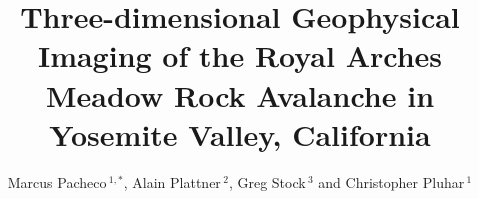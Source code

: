 \documentclass[utf8]{frontiersSCNS}
\def\firstAuthorLast{Pacheco {et~al.}} %
\def\Authors{Marcus Pacheco\,$^{1,*}$, Alain Plattner\,$^{2}$, Greg Stock\,$^{3}$ and Christopher Pluhar\,$^{1}$}
\begin{document}
\onecolumn
{}


\title[Royal Arches Meadow rock avalanche]{Three-dimensional Geophysical Imaging of the Royal Arches Meadow Rock Avalanche in Yosemite Valley, California}

\author[\firstAuthorLast ]{\Authors} %
\address{} %
\correspondance{} %

\extraAuth{}%







\maketitle
\end{document}
